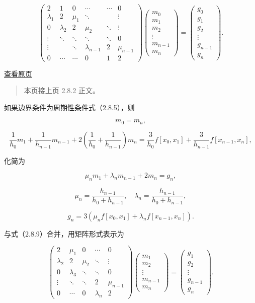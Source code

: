 \documentclass[
  10pt,
  fontset=fandol]{ctexart}
\begin{document}
\[\begin{pmatrix}
2&1&0&\cdots&\cdots&0\\
\lambda_1&2&\mu_1&\ddots&&\vdots\\
0&\lambda_2&2&\mu_2&\ddots&\vdots\\
\vdots&\ddots&\ddots&\ddots&\ddots&0\\
\vdots&&\ddots&\lambda_{n-1}&2&\mu_{n-1}\\
0&\cdots&\cdots&0&1&2
\end{pmatrix}
\begin{pmatrix}m_0\\m_1\\m_2\\\vdots\\m_{n-1}\\m_n\end{pmatrix}
=\begin{pmatrix}g_0\\g_1\\g_2\\\vdots\\g_{n-1}\\g_n\end{pmatrix}.\tag{2.8.14}\]

\href{../../source-images/pdf-052.jpeg}{查看原页}

\begin{quote}
本页接上页 2.8.2 正文。
\end{quote}

如果边界条件为周期性条件式（2.8.5），则

\[m_0=m_n,\]

\[\frac1{h_0}m_1+\frac1{h_{n-1}}m_{n-1}+2\left(\frac1{h_0}+\frac1{h_{n-1}}\right)m_n=\frac3{h_0}f[x_0,x_1]+\frac3{h_{n-1}}f[x_{n-1},x_n],\]

化简为

\[\mu_nm_1+\lambda_nm_{n-1}+2m_n=g_n,\]

\[\mu_n=\frac{h_{n-1}}{h_0+h_{n-1}},\quad\lambda_n=\frac{h_{n-1}}{h_0+h_{n-1}},\]

\[g_n=3(\mu_nf[x_0,x_1]+\lambda_nf[x_{n-1},x_n]).\]

与式（2.8.9）合并，用矩阵形式表示为

\[\begin{pmatrix}
2&\mu_1&0&\cdots&0\\
\lambda_2&2&\mu_2&\ddots&\vdots\\
0&\lambda_3&\ddots&\ddots&0\\
\vdots&\ddots&\ddots&2&\mu_{n-1}\\
0&\cdots&0&\lambda_n&2
\end{pmatrix}
\begin{pmatrix}m_1\\m_2\\\vdots\\m_{n-1}\\m_n\end{pmatrix}
=\begin{pmatrix}g_1\\g_2\\\vdots\\g_{n-1}\\g_n\end{pmatrix}.\tag{2.8.15}\]
\end{document}
